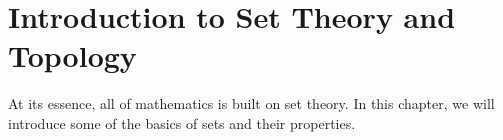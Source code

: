 \chapter{Introduction to Set Theory and Topology}

At its essence, all of mathematics is built on set theory.  In this chapter, we will introduce some of the basics of sets and their properties.